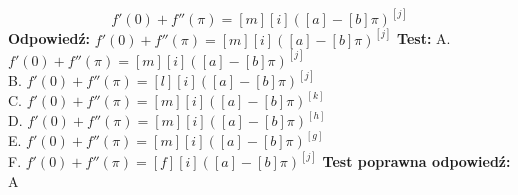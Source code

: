 \documentclass[12pt, a4paper]{article}
\theoremstyle{definition} %
\newcommand{\rozwStop}{\newline}                                            %
\newcommand{\odpStart}{\noindent \textbf{Odpowiedź:}\newline}    %
\newcommand{\odpStop}{\newline}                                             %
\newcommand{\testStart}{\noindent \textbf{Test:}\newline} %
\newcommand{\testStop}{\newline} %
\newcommand{\kluczStart}{\noindent \textbf{Test poprawna odpowiedź:}\newline} %
\newcommand{\kluczStop}{\newline} %
\begin{document}
$$f'(0)+f''(\pi) = [m]  [i]\left([a]-[b]\pi \right)^{[j]} $$
\rozwStop
\odpStart
$f'(0)+f''(\pi) = [m]  [i]\left([a]-[b]\pi \right)^{[j]} $
\odpStop
\testStart
A. $f'(0)+f''(\pi) = [m]  [i]\left([a]-[b]\pi \right)^{[j]} $\\
B. $f'(0)+f''(\pi) = [l]  [i]\left([a]-[b]\pi \right)^{[j]} $ \\
C. $f'(0)+f''(\pi) = [m]  [i]\left([a]-[b]\pi \right)^{[k]} $\\
D. $f'(0)+f''(\pi) = [m]  [i]\left([a]-[b]\pi \right)^{[h]} $\\
E. $f'(0)+f''(\pi) = [m]  [i]\left([a]-[b]\pi \right)^{[g]} $\\
F. $f'(0)+f''(\pi) = [f]  [i]\left([a]-[b]\pi \right)^{[j]} $
\testStop
\kluczStart
A
\kluczStop
\end{document}
